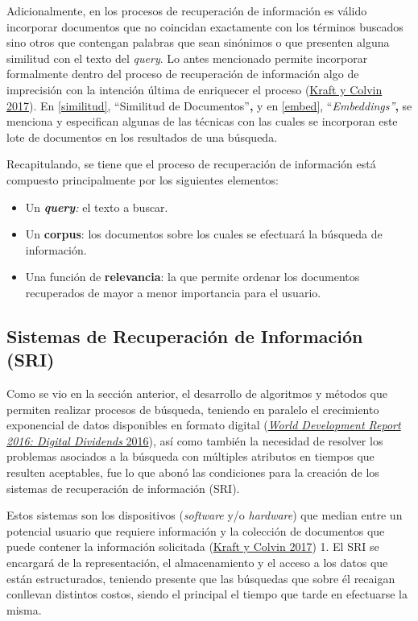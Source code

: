 \documentclass[
  12pt,
  openany]{book}
\begin{document}
Adicionalmente, en los procesos de recuperación de información es válido incorporar documentos que no coincidan exactamente con los términos buscados sino otros que contengan palabras que sean sinónimos o que presenten alguna similitud con el texto del \emph{query}. Lo antes mencionado permite incorporar formalmente dentro del proceso de recuperación de información algo de imprecisión con la intención última de enriquecer el proceso (\protect\hyperlink{ref-kraft2017}{Kraft y Colvin 2017}). En \ref{similitud}, ``Similitud de Documentos''\textbf{,} y en \ref{embed}, ``\emph{Embeddings''}\textbf{,} se menciona y especifican algunas de las técnicas con las cuales se incorporan este lote de documentos en los resultados de una búsqueda.

Recapitulando, se tiene que el proceso de recuperación de información está compuesto principalmente por los siguientes elementos:

\begin{itemize}
\item
  Un \emph{\textbf{query}:} el texto a buscar.
\item
  Un \textbf{corpus}: los documentos sobre los cuales se efectuará la búsqueda de información.
\item
  Una función de \textbf{relevancia}: la que permite ordenar los documentos recuperados de mayor a menor importancia para el usuario.
\end{itemize}

\hypertarget{SRI}{%
\subsection{Sistemas de Recuperación de Información (SRI)}\label{SRI}}

Como se vio en la sección anterior, el desarrollo de algoritmos y métodos que permiten realizar procesos de búsqueda, teniendo en paralelo el crecimiento exponencial de datos disponibles en formato digital (\protect\hyperlink{ref-worldde2016}{\emph{World Development Report 2016: Digital Dividends} 2016}), así como también la necesidad de resolver los problemas asociados a la búsqueda con múltiples atributos en tiempos que resulten aceptables, fue lo que abonó las condiciones para la creación de los sistemas de recuperación de información (SRI).

Estos sistemas son los dispositivos (\emph{software} y/o \emph{hardware}) que median entre un potencial usuario que requiere información y la colección de documentos que puede contener la información solicitada (\protect\hyperlink{ref-kraft2017}{Kraft y Colvin 2017}) 1. El SRI se encargará de la representación, el almacenamiento y el acceso a los datos que están estructurados, teniendo presente que las búsquedas que sobre él recaigan conllevan distintos costos, siendo el principal el tiempo que tarde en efectuarse la misma.
\end{document}
